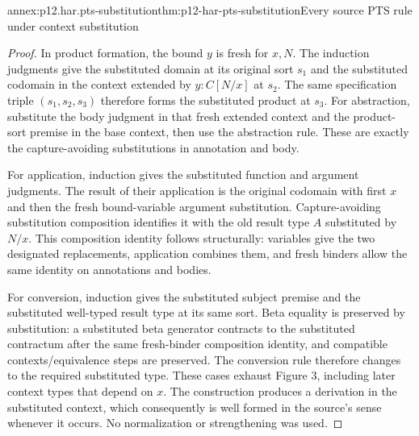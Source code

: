 \begin{annexitem}{annex:p12.har.pts-substitution}{thm:p12-har-pts-substitution}{Every source PTS rule under context substitution}
\begin{proof}
In product formation, the bound \(y\) is fresh for \(x,N\).
The induction judgments give the substituted domain at its original
sort \(s_1\) and the substituted codomain in the context extended
by \(y:C[N/x]\) at \(s_2\). The same specification triple
\((s_1,s_2,s_3)\) therefore forms the substituted product at
\(s_3\). For abstraction, substitute the body judgment in that
fresh extended context and the product-sort premise in the base
context, then use the abstraction rule. These are exactly the
capture-avoiding substitutions in annotation and body.

For application, induction gives the substituted function and argument
judgments. The result of their application is the original codomain
with first \(x\) and then the fresh bound-variable argument
substitution. Capture-avoiding substitution composition identifies it
with the old result type \(A\) substituted by \(N/x\).
This composition identity follows structurally: variables give the two
designated replacements, application combines them, and fresh binders
allow the same identity on annotations and bodies.

For conversion, induction gives the substituted subject premise and
the substituted well-typed result type at its same sort. Beta equality
is preserved by substitution: a substituted beta generator contracts
to the substituted contractum after the same fresh-binder composition
identity, and compatible contexts/equivalence steps are preserved.
The conversion rule therefore changes to the required substituted type.
These cases exhaust Figure 3, including later context types that
depend on \(x\). The construction produces a derivation in the
substituted context, which consequently is well formed in the source's
sense whenever it occurs. No normalization or strengthening was used.
\end{proof}
\end{annexitem}


